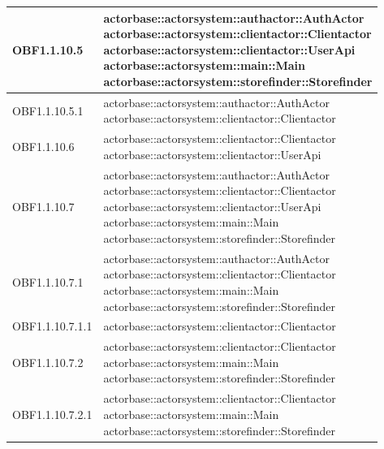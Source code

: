 \documentclass{scalatekids-article}
\begin{document}
\begin{longtable}[H]{|p{5cm}|p{12cm}|}
\hline
OBF1.1.10.5 & \multiLineCell[t]{actorbase::actorsystem::authactor::AuthActor\\actorbase::actorsystem::clientactor::Clientactor\\actorbase::actorsystem::clientactor::UserApi\\actorbase::actorsystem::main::Main\\actorbase::actorsystem::storefinder::Storefinder\\}\\
\hline
OBF1.1.10.5.1 & \multiLineCell[t]{actorbase::actorsystem::authactor::AuthActor\\actorbase::actorsystem::clientactor::Clientactor\\}\\
\hline
OBF1.1.10.6 & \multiLineCell[t]{actorbase::actorsystem::clientactor::Clientactor\\actorbase::actorsystem::clientactor::UserApi\\}\\
\hline
OBF1.1.10.7 & \multiLineCell[t]{actorbase::actorsystem::authactor::AuthActor\\actorbase::actorsystem::clientactor::Clientactor\\actorbase::actorsystem::clientactor::UserApi\\actorbase::actorsystem::main::Main\\actorbase::actorsystem::storefinder::Storefinder\\}\\
\hline
OBF1.1.10.7.1 & \multiLineCell[t]{actorbase::actorsystem::authactor::AuthActor\\actorbase::actorsystem::clientactor::Clientactor\\actorbase::actorsystem::main::Main\\actorbase::actorsystem::storefinder::Storefinder\\}\\
\hline
OBF1.1.10.7.1.1 & \multiLineCell[t]{actorbase::actorsystem::clientactor::Clientactor\\}\\
\hline
OBF1.1.10.7.2 & \multiLineCell[t]{actorbase::actorsystem::clientactor::Clientactor\\actorbase::actorsystem::main::Main\\actorbase::actorsystem::storefinder::Storefinder\\}\\
\hline
OBF1.1.10.7.2.1 & \multiLineCell[t]{actorbase::actorsystem::clientactor::Clientactor\\actorbase::actorsystem::main::Main\\actorbase::actorsystem::storefinder::Storefinder\\}\\

\end{longtable}
\end{document}
